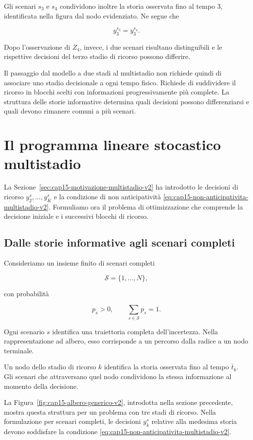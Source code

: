 Gli scenari $s_3$ e $s_4$ condividono
inoltre la storia osservata fino
al tempo $3$, identificata nella
figura dal nodo evidenziato.
Ne segue che

\[
y_3^{s_3}=y_3^{s_4}.
\]

Dopo l'osservazione di $Z_4$,
invece, i due scenari risultano
distinguibili e le rispettive
decisioni del terzo stadio
di ricorso possono differire.

Il passaggio dal modello a due stadi
al multistadio non richiede quindi
di associare uno stadio decisionale
a ogni tempo fisico. Richiede
di suddividere il ricorso in blocchi
scelti con informazioni progressivamente
pi\`u complete. La struttura
delle storie informative determina
quali decisioni possono differenziarsi
e quali devono rimanere comuni
a pi\`u scenari.

\section{Il programma lineare stocastico multistadio}

\label{sec:cap15-programma-multistadio-v2}

La Sezione~\ref{sec:cap15-motivazione-multistadio-v2}
ha introdotto le decisioni di ricorso
$y_2^s,\ldots,y_K^s$ e la condizione
di non anticipativit\`a
\eqref{eq:cap15-non-anticipativita-multistadio-v2}.
Formuliamo ora il problema di ottimizzazione
che comprende la decisione iniziale e
i successivi blocchi di ricorso.


\subsection{Dalle storie informative agli scenari completi}

Consideriamo un insieme finito di scenari completi

\[
\mathcal S=\{1,\ldots,N\},
\]

con probabilit\`a

\[
p_s>0,
\qquad
\sum_{s\in\mathcal S}p_s=1.
\]

Ogni scenario $s$ identifica una traiettoria
completa dell'incertezza. Nella rappresentazione
ad albero, esso corrisponde a un percorso
dalla radice a un nodo terminale.

Un nodo dello stadio di ricorso $k$
identifica la storia osservata fino
al tempo $\bar t_k$. Gli scenari
che attraversano quel nodo
condividono la stessa informazione
al momento della decisione.

La Figura~\ref{fig:cap15-albero-generico-v2},
introdotta nella sezione precedente,
mostra questa struttura per un problema
con tre stadi di ricorso. Nella formulazione
per scenari completi, le decisioni
$y_k^s$ relative alla medesima storia
devono soddisfare la condizione
\eqref{eq:cap15-non-anticipativita-multistadio-v2}.

